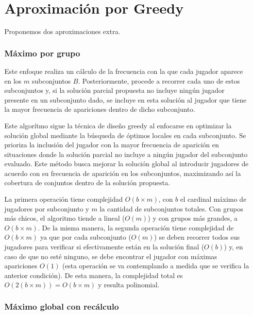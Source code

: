 \section{Aproximación por Greedy}

Proponemos dos aproximaciones extra.

\subsubsection{Máximo por grupo}
Este enfoque realiza un cálculo de la frecuencia con la que cada jugador aparece en los $m$ subconjuntos $B$. Posteriormente, procede a recorrer cada uno de estos subconjuntos y, si la solución parcial propuesta no incluye ningún jugador presente en un subconjunto dado, se incluye en esta solución al jugador que tiene la mayor frecuencia de apariciones dentro de dicho subconjunto.

Este algorítmo sigue la técnica de diseño greedy al enfocarse en optimizar la solución global mediante la búsqueda de óptimos locales en cada subconjunto. Se prioriza la inclusión del jugador con la mayor frecuencia de aparición en situaciones donde la solución parcial no incluye a ningún jugador del subconjunto evaluado. Este método busca mejorar la solución global al introducir jugadores de acuerdo con su frecuencia de aparición en los subconjuntos, maximizando así la cobertura de conjuntos dentro de la solución propuesta.



La primera operación tiene complejidad $O(b \times m)$, con $b$ el cardinal máximo de jugadores por subconjunto y $m$ la cantidad de subconjuntos totales. Con grupos más chicos, el algoritmo tiende a lineal ($O(m)$) y con grupos más grandes, a $O(b\times m)$. 
De la misma manera, la segunda operación tiene complejidad de  $O(b\times m)$ ya que por cada subconjunto ($O(m)$) se deben recorrer todos sus jugadores para verificar si efectivamente están en la solución final ($O(b)$) y, en caso de que no esté ninguno, se debe encontrar el jugador con máximas apariciones $O(1)$ (esta operación se va contemplando a medida que se verifica la anterior condición). De esta manera, la complejidad total es $O(2(b \times m))=O(b \times m)$ y resulta polinomial.

\subsubsection{Máximo global con recálculo}

